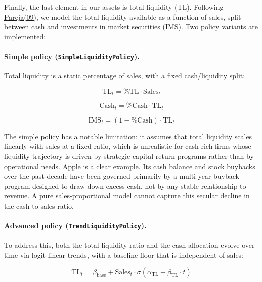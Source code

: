 \documentclass[12pt,a4paper]{article}
\begin{document}
Finally, the last element in our assets is total liquidity (TL).
Following \hyperlink{ref:pareja09}{Pareja(09)}, we model the total liquidity available as a
function of sales, split between cash and investments in market
securities (IMS). Two policy variants are implemented:

\paragraph{Simple policy (\texttt{SimpleLiquidityPolicy}).}
Total liquidity is a static percentage of sales, with a fixed
cash/liquidity split:

\begin{equation}\label{eq:total_liquidity}
\text{TL}_t = \text{\%TL} \cdot \text{Sales}_t
\end{equation}

\begin{equation}\label{eq:cash}
\text{Cash}_t = \text{\%Cash} \cdot \text{TL}_t
\end{equation}

\begin{equation}\label{eq:ims}
\text{IMS}_t = (1 - \text{\%Cash}) \cdot \text{TL}_t
\end{equation}

The simple policy has a notable limitation: it assumes that total
liquidity scales linearly with sales at a fixed ratio, which is
unrealistic for cash-rich firms whose liquidity trajectory is driven by
strategic capital-return programs rather than by operational needs. Apple
is a clear example. Its cash balance and stock buybacks over the past
decade have been governed primarily by a multi-year buyback program
designed to draw down excess cash, not by any stable relationship to
revenue. A pure sales-proportional model cannot capture this secular
decline in the cash-to-sales ratio.

\paragraph{Advanced policy (\texttt{TrendLiquidityPolicy}).}
To address this, both the total liquidity ratio and the cash allocation
evolve over time via logit-linear trends, with a baseline floor that is
independent of sales:

\begin{equation}\label{eq:total_liquidity_trend}
\text{TL}_t = \beta_{\text{base}} + \text{Sales}_t \cdot \sigma(\alpha_{\text{TL}} + \beta_{\text{TL}} \cdot t)
\end{equation}
\end{document}
